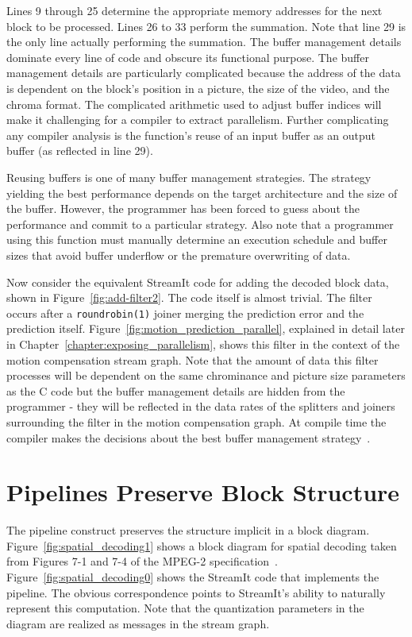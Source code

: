 Lines 9 through 25 determine the appropriate memory addresses 
for the next block to be processed. Lines 26 to 33 perform the
summation.
Note that line 29 is the only line actually performing the summation. 
The buffer management details dominate every line of code and obscure its functional
purpose. 
The buffer management details are particularly complicated
because the address of the data is dependent on the block's position in a picture,
the size of the video, and the chroma format. The complicated arithmetic
used to adjust buffer indices will make it challenging for a compiler to extract
parallelism. Further complicating any compiler analysis is the function's reuse
 of an input buffer as an output buffer (as reflected in
line 29). 

Reusing buffers is one of many buffer management strategies. The strategy yielding
the best performance depends on the 
target architecture and the size of the buffer. However, the programmer has been
forced to guess about the performance and commit to a particular strategy. 
Also note that a programmer using this function must manually determine 
an execution schedule and buffer sizes that avoid buffer underflow or the premature
overwriting of data.

Now consider the equivalent StreamIt code for adding the decoded block data, shown in
Figure~\ref{fig:add-filter2}. The code itself is almost trivial. The filter 
occurs after a \texttt{roundrobin(1)} joiner merging the prediction error
and the prediction itself. Figure~\ref{fig:motion_prediction_parallel}, 
explained in detail later in Chapter~\ref{chapter:exposing_parallelism}, shows
this filter in the context of the motion compensation stream graph. Note that 
the amount of data this filter processes will 
be dependent on the same chrominance and picture size parameters as the C code
but the buffer management details are hidden from the programmer - they will
be reflected in the data rates of the splitters and joiners surrounding
the filter in the motion compensation graph. At compile
time the compiler makes the decisions about the best buffer management 
strategy~\cite{sermulins05lctes}.  

\section{Pipelines Preserve Block Structure}
\label{sec:pipelines_block}

The pipeline construct preserves the structure implicit in a block diagram.
Figure~\ref{fig:spatial_decoding1} shows a block diagram for spatial decoding
taken from Figures 7-1 and 7-4 of the MPEG-2 specification~\cite{MPEG2}.
Figure~\ref{fig:spatial_decoding0} shows the 
StreamIt code that implements the pipeline. The obvious 
correspondence points to StreamIt's ability to naturally
represent this computation. Note that the quantization
parameters in the diagram are realized as messages in the stream graph.

